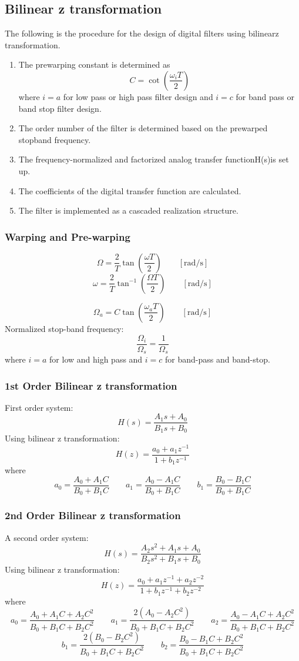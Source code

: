 \subsection{Bilinear z transformation}
The following is the procedure for the design of digital filters using bilinearz transformation.
\begin{enumerate}
  \item The prewarping constant is determined as
    $$C=\cot\left(\frac{\omega_iT}{2}\right)$$
    where $i=a$ for low pass or high pass filter design and $i=c$ for band pass or band stop filter design.
  \item The order number of the filter is determined based on the prewarped stopband frequency.
  \item The frequency-normalized and factorized analog transfer functionH(s)is set up.
  \item The coefficients of the digital transfer function are calculated.
  \item The filter is implemented as a cascaded realization structure.
\end{enumerate}
\subsubsection{Warping and Pre-warping}
$$\Omega={\frac{2}{T}}\tan\left({\frac{\omega T}{2}}\right)\qquad\mathrm{\left[rad/s\right]}$$
$$\omega={\frac{2}{T}}\tan^{-1}\left({\frac{\Omega T}{2}}\right)\qquad\mathrm{\left[rad/s\right]}$$

$$\Omega_a=C\tan\left({\frac{\omega_a T}{2}}\right)\qquad\mathrm{\left[rad/s\right]}$$
Normalized stop-band frequency:
$$\frac{\Omega_i}{\Omega_s}=\frac{1}{\Omega_s}$$
where $i=a$ for low and high pass and $i=c$ for band-pass and band-stop.
\subsubsection{1st Order Bilinear z transformation}
First order system:
$$H(s)=\frac{A_{1}s+A_{0}}{B_{1}s+B_{0}}$$
Using bilinear z transformation:
$$H(z)=\frac{a_0+a_1z^{-1}}{1+b_1z^{-1}}$$
where
$$a_{0}=\frac{A_{0}+A_{1}C}{B_{0}+B_{1}C}\qquad a_{1}=\frac{A_{0}-A_{1}C}{B_{0}+B_{1}C}\qquad b_{1}=\frac{B_{0}-B_{1}C}{B_{0}+B_{1}C}$$
\subsubsection{2nd Order Bilinear z transformation}
A second order system:
$$H(s)={\frac{A_{2}s^{2}+A_{1}s+A_{0}}{B_{2}s^{2}+B_{1}s+B_{0}}}$$
Using bilinear z transformation:
$$H(z)={\frac{a_{0}+a_{1}z^{-1}+a_{2}z^{-2}}{1+b_{1}z^{-1}+b_{2}z^{-2}}}$$
where
$$a_{0}=\frac{A_{0}+A_{1}C+A_{2}C^{2}}{B_{0}+B_{1}C+B_{2}C^{2}}\qquad a_{1}=\frac{2(A_{0}-A_{2}C^{2})}{B_{0}+B_{1}C+B_{2}C^{2}}\qquad a_{2}=\frac{A_{0}-A_{1}C+A_{2}C^{2}}{B_{0}+B_{1}C+B_{2}C^{2}}$$
$$b_{1}=\frac{2(B_{0}-B_{2}C^{2})}{B_{0}+B_{1}C+B_{2}C^{2}}\qquad b_{2}=\frac{B_{0}-B_{1}C+B_{2}C^{2}}{B_{0}+B_{1}C+B_{2}C^{2}}$$
